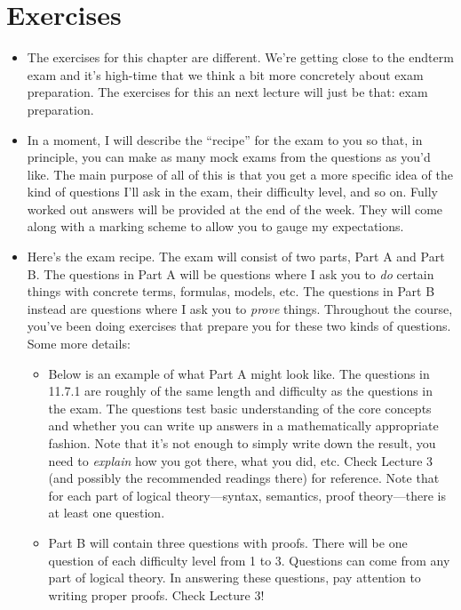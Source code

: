 \section{Exercises}

\begin{itemize}
\item The exercises for this chapter are different. We're getting
 close to the endterm exam and it's high-time that we think a bit more
 concretely about exam preparation. The exercises for this an next lecture will just be that: exam preparation.

 \item In a moment, I will describe the ``recipe'' for the exam to you
so that, in principle, you can make as many mock exams from the
questions as you'd like. The main purpose of all of this is that you
get a more specific idea of the kind of questions I'll ask in the
exam, their difficulty level, and so on. Fully worked out answers will be
provided at the end of the week. They will come along with a marking
scheme to allow you to gauge my expectations.

\item Here's the exam recipe. The exam will consist of two parts, Part A and Part
  B. The questions in Part A will be questions where I ask you to
  \emph{do} certain things with concrete terms, formulas, models,
  etc. The questions in Part B instead are questions where I ask you
  to \emph{prove} things. Throughout the course, you've been
  doing exercises that prepare you for these two kinds of
  questions. Some more details:

  \begin{itemize}

    \item Below is an example of what Part A might look like. The
      questions in 11.7.1 are roughly of the same length and
      difficulty as the questions in the exam. The questions test
      basic understanding of the core concepts and whether you can
      write up answers in a mathematically appropriate fashion. Note
      that it's not enough to simply write down the result, you need
      to \emph{explain} how you got there, what you did, etc. Check
      Lecture 3 (and possibly the recommended readings there) for
      reference. Note that for each part of logical theory---syntax,
      semantics, proof theory---there is at least one question.

    \item Part B will contain three questions with proofs. There will
      be one question of each difficulty level from 1 to 3. Questions
      can come from any part of logical theory. In answering these
      questions, pay attention to writing proper proofs. Check Lecture
      3! 


\end{itemize}
\end{itemize}
